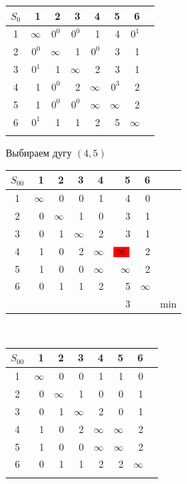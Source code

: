 \documentclass[12pt]{article}
\begin{document}
\begin{flushleft}
\begin{tabular}{c||rrrrrr||c}
$S_0$ & 1 & 2 & 3 & 4 & 5 & 6 & \\
\hline
\hline
1 & $\infty$ & $0^0$ & $0^0$ & 1 & 4 & $0^1$ & \\
2 & $0^0$ & $\infty$ & 1 & $0^0$ & 3 & 1 & \\
3 & $0^1$ & 1 & $\infty$ & 2 & 3 & 1 & \\
4 & 1 & $0^0$ & 2 & $\infty$ & $0^3$ & 2 & \\
5 & 1 & $0^0$ & $0^0$ & $\infty$ & $\infty$ & 2 \\
6 & $0^1$ & 1 & 1 & 2 & 5 & $\infty$ & \\
\hline
\hline
 &  &  &  &  &  &  & \\
\end{tabular}
\end{flushleft}

Выбираем дугу $(4,5)$

\begin{flushleft}
 \begin{tabular}{c||rrrrrr||c}
$S_{00}$ & 1 & 2 & 3 & 4 & 5 & 6 & \\
\hline
\hline
1 & $\infty$ & 0 & 0 & 1 & 4 & 0 & \\
2 & 0 & $\infty$ & 1 & 0 & 3 & 1 & \\
3 & 0 & 1 & $\infty$ & 2 & 3 & 1 & \\
4 & 1 & 0 & 2 & $\infty$ & $\colorbox{red}{$\infty$}$ & 2 & \\
5 & 1 & 0 & 0 & $\infty$ & $\infty$ & 2 \\
6 & 0 & 1 & 1 & 2 & 5 & $\infty$ & \\
\hline
\hline
 &  &  &  &  & 3 &  & min \\
\end{tabular}
$\qquad $  
\begin{tabular}{c||rrrrrr||c}
$S_{00}$ & 1 & 2 & 3 & 4 & 5 & 6 & \\
\hline
\hline
1 & $\infty$ & 0 & 0 & 1 & 1 & 0 & \\
2 & 0 & $\infty$ & 1 & 0 & 0 & 1 & \\
3 & 0 & 1 & $\infty$ & 2 & 0 & 1 & \\
4 & 1 & 0 & 2 & $\infty$ & $\infty$ & 2 & \\
5 & 1 & 0 & 0 & $\infty$ & $\infty$ & 2 \\
6 & 0 & 1 & 1 & 2 & 2 & $\infty$ & \\
\hline
\hline
 &  &  &  &  &  &  & \\
\end{tabular}
\end{flushleft}
\end{document}
